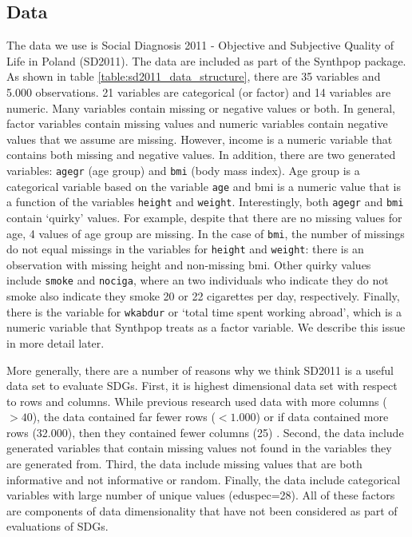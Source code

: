 \documentclass[runningheads]{llncs}
\begin{document}
\subsection{Data}

The data we use is Social Diagnosis 2011 - Objective and Subjective Quality of Life in Poland (SD2011).  The data are included as part of the Synthpop package.  As shown in table \ref{table:sd2011_data_structure}, there are 35 variables and 5.000 observations.  21 variables are categorical (or factor) and 14 variables are numeric.  Many variables contain missing or negative values or both.  In general, factor variables contain missing values and numeric variables contain negative values that we assume are missing.  However, income is a numeric variable that contains both missing and negative values.  In addition, there are two generated variables: \texttt{agegr} (age group) and \texttt{bmi} (body mass index).  Age group is a categorical variable based on the variable \texttt{age} and bmi is a numeric value that is a function of the variables \texttt{height} and \texttt{weight}.  Interestingly, both \texttt{agegr} and \texttt{bmi} contain `quirky' values.  For example, despite that there are no missing values for age, 4 values of age group are missing.  In the case of \texttt{bmi}, the number of missings do not equal missings in the variables for \texttt{height} and \texttt{weight}: there is an observation with missing height and non-missing bmi.  Other quirky values include \texttt{smoke} and \texttt{nociga}, where an two individuals who indicate they do not smoke also indicate they smoke 20 or 22 cigarettes per day, respectively.  Finally, there is the variable for \texttt{wkabdur} or `total time spent working abroad', which is a numeric variable that Synthpop treats as a factor variable.  We describe this issue in more detail later.

More generally, there are a number of reasons why we think SD2011 is a useful data set to evaluate SDGs.  First, it is highest dimensional data set with respect to rows and columns.  While previous research used data with more columns ($> 40$), the data contained far fewer rows ($< 1.000$) \cite{dankar2021fake} or if data contained more rows (32.000), then they contained fewer columns (25) \cite{little2022comparing}.  Second, the data include generated variables that contain missing values not found in the variables they are generated from.  Third, the data include missing values that are both informative and not informative or random.  Finally, the data include categorical variables with large number of unique values (eduspec=28).  All of these factors are components of data dimensionality that have not been considered as part of evaluations of SDGs.
\end{document}

